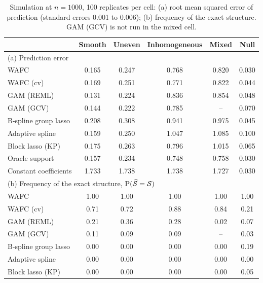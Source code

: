 \begin{table}[tp]
\color{colR1}
\caption{Simulation at $n = 1000$, 100 replicates per cell: (a) root mean
squared error of prediction (standard errors 0.001 to 0.006); (b) frequency
of the exact structure. GAM (GCV) is not run in the mixed cell.}
\label{tab:sim-main}
\centering
\small
\begin{tabular}{lccccc}
\hline
 & Smooth & Uneven & Inhomogeneous & Mixed & Null \\
\hline
\multicolumn{6}{l}{(a) Prediction error} \\
WAFC & 0.165 & 0.247 & 0.768 & 0.820 & 0.030 \\
WAFC (cv) & 0.169 & 0.251 & 0.771 & 0.822 & 0.044 \\
GAM (REML) & 0.131 & 0.224 & 0.836 & 0.854 & 0.048 \\
GAM (GCV) & 0.144 & 0.222 & 0.785 & -- & 0.070 \\
B-spline group lasso & 0.208 & 0.308 & 0.941 & 0.975 & 0.045 \\
Adaptive spline & 0.159 & 0.250 & 1.047 & 1.085 & 0.100 \\
Block lasso (KP) & 0.175 & 0.263 & 0.796 & 1.015 & 0.065 \\
Oracle support & 0.157 & 0.234 & 0.748 & 0.758 & 0.030 \\
Constant coefficients & 1.733 & 1.738 & 1.738 & 1.727 & 0.030 \\
\hline
\multicolumn{6}{l}{(b) Frequency of the exact structure, $\mathrm{P}(\widehat{\mathcal{S}} = \mathcal{S})$} \\
WAFC & 1.00 & 1.00 & 1.00 & 1.00 & 1.00 \\
WAFC (cv) & 0.71 & 0.72 & 0.88 & 0.84 & 0.21 \\
GAM (REML) & 0.21 & 0.36 & 0.28 & 0.02 & 0.07 \\
GAM (GCV) & 0.11 & 0.09 & 0.09 & -- & 0.03 \\
B-spline group lasso & 0.00 & 0.00 & 0.00 & 0.00 & 0.19 \\
Adaptive spline & 0.00 & 0.00 & 0.00 & 0.00 & 0.00 \\
Block lasso (KP) & 0.00 & 0.00 & 0.00 & 0.00 & 0.05 \\
\hline
\end{tabular}
\end{table}
